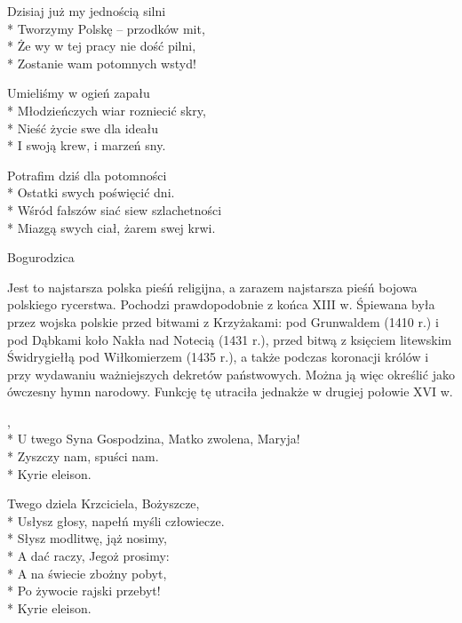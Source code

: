 \begin{lyrics}[longestline={Na stos rzuciliśmy -- swój życia los,}]
Dzisiaj już my jednością silni\\*
Tworzymy Polskę -- przodków mit,\\*
Że wy w tej pracy nie dość pilni,\\*
Zostanie wam potomnych wstyd!

\chorusref

Umieliśmy w ogień zapału\\*
Młodzieńczych wiar rozniecić skry,\\*
Nieść życie swe dla ideału\\*
I swoją krew, i marzeń sny.

\chorusref

Potrafim dziś dla potomności\\*
Ostatki swych poświęcić dni.\\*
Wśród fałszów siać siew szlachetności\\*
Miazgą swych ciał, żarem swej krwi.

\chorusref
\end{lyrics}



\song
{Bogurodzica}
\begin{info}Jest to najstarsza polska pieśń religijna, a zarazem najstarsza pieśń bojowa polskiego rycerstwa. Pochodzi prawdopodobnie z końca XIII w. Śpiewana była przez wojska polskie przed bitwami z Krzyżakami: pod Grunwaldem (1410 r.) i pod Dąbkami koło Nakła nad Notecią (1431 r.), przed bitwą z księciem litewskim Świdrygiełłą pod Wiłkomierzem (1435 r.), a także podczas koronacji królów i przy wydawaniu ważniejszych dekretów państwowych. Można ją więc określić jako ówczesny hymn narodowy. Funkcję tę utraciła jednakże w drugiej połowie XVI w.\end{info}

\begin{lyrics}[longestline={U twego Syna Gospodzina, Matko zwolena, Maryja!}]

,\\*
U twego Syna Gospodzina, Matko zwolena, Maryja!\\*
Zyszczy nam, spuści nam.\\*
Kyrie eleison.

Twego dziela Krzciciela, Bożyszcze,\\*
Usłysz głosy, napełń myśli człowiecze.\\*
Słysz modlitwę, jąż nosimy,\\*
A dać raczy, Jegoż prosimy:\\*
A na świecie zbożny pobyt,\\*
Po żywocie rajski przebyt!\\*
Kyrie eleison.
\end{lyrics}



